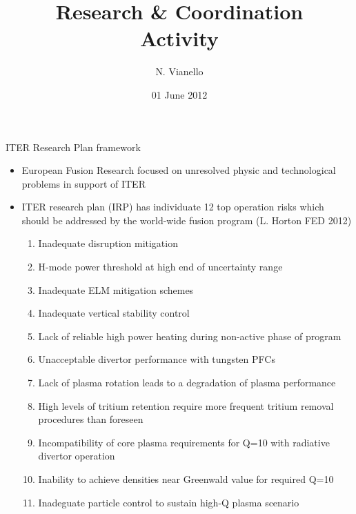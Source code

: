\documentclass[t,10pt]{beamer}
\title{Research \& Coordination  \\
Activity}
\author{N. Vianello }
\date{01 June 2012}
\begin{document}
\begin{titleframe}
\end{titleframe}

\begin{frame}{ITER Research Plan framework}
\begin{itemize}
\item European Fusion Research focused on unresolved physic and
technological problems in support of ITER
\item ITER research plan (IRP) has individuate 12 top operation risks which 
should be addressed by the world-wide fusion program {\footnotesize
  (L. Horton FED 2012)}
\begin{enumerate}
\item {} Inadequate disruption mitigation
\item {} H-mode power threshold at high end of
  uncertainty range
\item {} Inadequate ELM mitigation schemes
\item {} Inadequate vertical stability control
\item {}Lack of reliable high power heating during
  non-active phase of program
\item {} Unacceptable divertor performance with tungsten PFCs
\item {} Lack of plasma rotation leads to a
  degradation of plasma performance
\item {} High levels of tritium retention require more
  frequent tritium removal procedures than foreseen
\item {} Incompatibility of core plasma requirements for Q=10 with
  radiative divertor operation
\item {}Inability to achieve densities near
  Greenwald value for required Q=10
\item {} Inadeguate particle control to sustain
  high-Q plasma scenario
\end{enumerate}
\end{itemize}

\end{frame}
\end{document}
